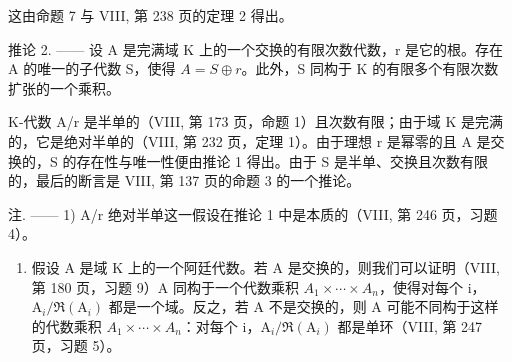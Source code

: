 这由命题 7 与 VIII, 第 238 页的定理 2 得出。

推论 2. —— 设 A 是完满域 K 上的一个交换的有限次数代数，r 是它的根。存在 A 的唯一的子代数 S，使得 \(A = S \oplus r\)。此外，S 同构于 K 的有限多个有限次数扩张的一个乘积。

K-代数 A/r 是半单的（VIII, 第 173 页，命题 1）且次数有限；由于域 K 是完满的，它是绝对半单的（VIII, 第 232 页，定理 1）。由于理想 r 是幂零的且 A 是交换的，S 的存在性与唯一性便由推论 1 得出。由于 S 是半单、交换且次数有限的，最后的断言是 VIII, 第 137 页的命题 3 的一个推论。

注. —— 1) A/r 绝对半单这一假设在推论 1 中是本质的（VIII, 第 246 页，习题 4）。

\begin{enumerate}
\def\labelenumi{\arabic{enumi})}
\setcounter{enumi}{1}
\tightlist
\item
  假设 A 是域 K 上的一个阿廷代数。若 A 是交换的，则我们可以证明（VIII, 第 180 页，习题 9）A 同构于一个代数乘积 \(A_{1} \times \cdots \times A_{n}\)，使得对每个 i，\(\mathrm{A}_{i}/\Re(\mathrm{A}_{i})\) 都是一个域。反之，若 A 不是交换的，则 A 可能不同构于这样的代数乘积 \(A_{1} \times \cdots \times A_{n}\)：对每个 i，\(\mathrm{A}_{i}/\Re(\mathrm{A}_{i})\) 都是单环（VIII, 第 247 页，习题 5）。
\end{enumerate}

